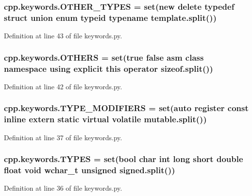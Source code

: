 \subsubsection[{\texorpdfstring{O\+T\+H\+E\+R\+\_\+\+T\+Y\+P\+ES}{OTHER_TYPES}}]{\setlength{\rightskip}{0pt plus 5cm}cpp.\+keywords.\+O\+T\+H\+E\+R\+\_\+\+T\+Y\+P\+ES = set(\textquotesingle{}new delete typedef struct union enum typeid typename template\textquotesingle{}.split())}\hypertarget{namespacecpp_1_1keywords_aa86a5e35a3ace14022a5ca1b91baf207}{}\label{namespacecpp_1_1keywords_aa86a5e35a3ace14022a5ca1b91baf207}


Definition at line 43 of file keywords.\+py.

\subsubsection[{\texorpdfstring{O\+T\+H\+E\+RS}{OTHERS}}]{\setlength{\rightskip}{0pt plus 5cm}cpp.\+keywords.\+O\+T\+H\+E\+RS = set(\textquotesingle{}true false asm class namespace using explicit this operator {\bf sizeof}\textquotesingle{}.split())}\hypertarget{namespacecpp_1_1keywords_a15fe231fbad145538b73892804898809}{}\label{namespacecpp_1_1keywords_a15fe231fbad145538b73892804898809}


Definition at line 42 of file keywords.\+py.

\subsubsection[{\texorpdfstring{T\+Y\+P\+E\+\_\+\+M\+O\+D\+I\+F\+I\+E\+RS}{TYPE_MODIFIERS}}]{\setlength{\rightskip}{0pt plus 5cm}cpp.\+keywords.\+T\+Y\+P\+E\+\_\+\+M\+O\+D\+I\+F\+I\+E\+RS = set(\textquotesingle{}auto register const inline extern static virtual volatile mutable\textquotesingle{}.split())}\hypertarget{namespacecpp_1_1keywords_af9282ce418d6b4b43dca5ed574caedd7}{}\label{namespacecpp_1_1keywords_af9282ce418d6b4b43dca5ed574caedd7}


Definition at line 37 of file keywords.\+py.

\subsubsection[{\texorpdfstring{T\+Y\+P\+ES}{TYPES}}]{\setlength{\rightskip}{0pt plus 5cm}cpp.\+keywords.\+T\+Y\+P\+ES = set(\textquotesingle{}bool char int long short double float void wchar\+\_\+t unsigned signed\textquotesingle{}.split())}\hypertarget{namespacecpp_1_1keywords_a56fd5baf357970548e1ec366edfc2c13}{}\label{namespacecpp_1_1keywords_a56fd5baf357970548e1ec366edfc2c13}


Definition at line 36 of file keywords.\+py.

